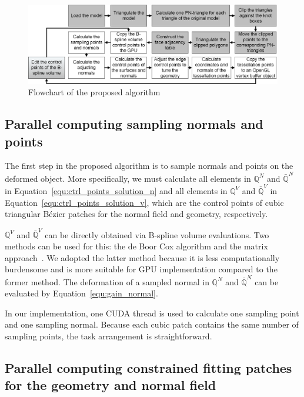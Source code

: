 \documentclass[3p]{elsarticle}
\begin{document}
\begin{figure}[htb]
	\centering
	\includegraphics[width=0.8\linewidth]{pic/flowchart.png}
	\caption{Flowchart of the proposed algorithm}
	\label{fig:workflow}
\end{figure}

\subsection{Parallel computing sampling normals and points}

The first step in the proposed algorithm is to sample normals and points on the deformed object. More specifically, we
must calculate all elements in $\mathbb Q^N$ and $\mathbb {\bar Q}^N$ in Equation~\ref{equ:ctrl_points_solution_n} and
all elements in $\mathbb Q^V$ and $\mathbb {\bar Q}^V$ in Equation~\ref{equ:ctrl_points_solution_v}, which are the
control points of cubic triangular B\'ezier patches for the normal field and geometry, respectively.

$\mathbb Q^V$ and $\mathbb {\bar Q}^V$ can be directly obtained via B-spline volume evaluations. Two methods can be used
for this: the de Boor Cox algorithm and the matrix approach~\cite{Farin02}. We adopted the latter method because it is
less computationally burdensome and is more suitable for GPU implementation compared to the former method. The
deformation of a sampled normal in $\mathbb Q^N$ and $\mathbb {\bar Q}^N$ can be evaluated by
Equation~\ref{equ:gain_normal}.

In our implementation, one CUDA thread is used to calculate one sampling point and one sampling normal. Because each
cubic patch contains the same number of sampling points, the task arrangement is straightforward.

\subsection{Parallel computing constrained fitting patches for the geometry and normal field}
\end{document}
